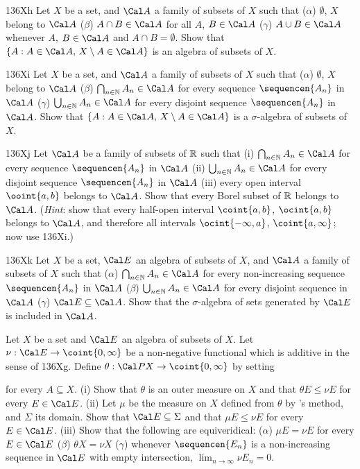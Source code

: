{\sqheader 136Xh Let $X$ be a set, and $\Cal A$ a family of subsets of
$X$ such that ($\alpha$) $\emptyset$, $X$ belong to $\Cal A$ ($\beta$)
$A\cap B\in\Cal A$ for all $A$, $B\in\Cal A$ ($\gamma$)
$A\cup B\in\Cal A$ whenever $A$, $B\in\Cal A$ and $A\cap B=\emptyset$.
Show that
$\{A:A\in\Cal A,\,X\setminus A\in\Cal A\}$ is an algebra of subsets of
$X$.

\sqheader 136Xi Let $X$ be a set, and $\Cal A$ a family of subsets of
$X$ such that ($\alpha$) $\emptyset$, $X$ belong to $\Cal A$ ($\beta$)
$\bigcap_{n\in\Bbb N}A_n\in\Cal A$ for every sequence $\sequencen{A_n}$
in $\Cal A$  ($\gamma$) $\bigcup_{n\in\Bbb N}A_n\in\Cal A$ for every
disjoint sequence $\sequencen{A_n}$ in $\Cal A$.   Show that
$\{A:A\in\Cal A,\,X\setminus A\in\Cal A\}$ is a $\sigma$-algebra of
subsets of $X$.

\sqheader 136Xj Let $\Cal A$ be a family of subsets of $\Bbb R$ such
that (i) $\bigcap_{n\in\Bbb N}A_n\in\Cal A$ for every sequence
$\sequencen{A_n}$ in $\Cal A$  (ii) $\bigcup_{n\in\Bbb N}A_n\in\Cal A$
for every disjoint sequence $\sequencen{A_n}$ in $\Cal A$ (iii) every
open interval $\ooint{a,b}$ belongs to $\Cal A$.   Show that every Borel
subset of $\Bbb R$ belongs to $\Cal A$.   ({\it Hint\/}:  show that
every half-open interval $\coint{a,b}$, $\ocint{a,b}$ belongs to
$\Cal A$, and
therefore all intervals $\ocint{-\infty,a}$, $\coint{a,\infty}$;  now
use 136Xi.)

\sqheader 136Xk Let $X$ be a set, $\Cal E$ an algebra of subsets of $X$,
and $\Cal A$ a family of subsets of $X$ such that ($\alpha$)
$\bigcap_{n\in\Bbb N}A_n\in\Cal A$ for every non-increasing sequence
$\sequencen{A_n}$ in $\Cal A$ ($\beta$)
$\bigcup_{n\in\Bbb N}A_n\in\Cal A$ for every disjoint sequence in
$\Cal A$ ($\gamma$) $\Cal E\subseteq\Cal A$.   Show that the
$\sigma$-algebra of sets generated by
$\Cal E$ is included in $\Cal A$.   

 Let $X$ be a set and $\Cal E$ an
algebra of subsets of $X$.   Let $\nu:\Cal E\to\coint{0,\infty}$ be a
non-negative functional which is additive in the sense of 136Xg.
Define $\theta:\Cal PX\to\coint{0,\infty}$ by setting


\noindent for every $A\subseteq X$.   (i) Show that $\theta$ is an outer
measure on $X$ and that $\theta E\le\nu E$ for every $E\in\Cal E$.
(ii) Let $\mu$ be the measure on $X$ defined from $\theta$ by
\Caratheodory's method, and $\Sigma$ its domain.   Show that $\Cal
E\subseteq\Sigma$ and that $\mu E\le\nu E$ for every $E\in\Cal E$.
(iii) Show that the following are equiveridical:  ($\alpha$)
$\mu E=\nu E$
for every $E\in\Cal E$ ($\beta$) $\theta X=\nu X$ ($\gamma$) whenever
$\sequencen{E_n}$ is a non-increasing sequence in $\Cal E$ with empty
intersection, $\lim_{n\to\infty}\nu E_n=0$.

}
